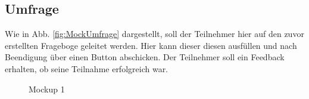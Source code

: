 \subsection{Umfrage}
\label{ssec:Umfrage}
Wie in Abb. \vref{fig:MockUmfrage} dargestellt, soll der Teilnehmer hier auf den zuvor erstellten Frageboge geleitet werden. 
Hier kann dieser diesen ausfüllen und nach Beendigung über einen Button abschicken. 
Der Teilnehmer soll ein Feedback erhalten, ob seine Teilnahme erfolgreich war. 


\begin{figure}
	\caption[Mockup 1]{Mockup 1 \\ \quelle}
	\label{fig:MockUmfrage}
\end{figure}